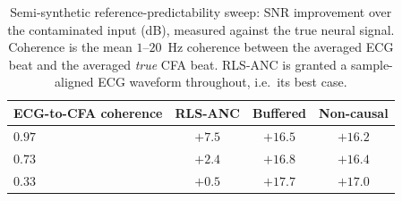 \begin{table}[!t]
\centering
\caption{Semi-synthetic reference-predictability sweep: SNR improvement over the
contaminated input (dB), measured against the true neural signal. Coherence is the mean
$1$--$20$~Hz coherence between the averaged ECG beat and the averaged \emph{true} CFA beat.
RLS-ANC is granted a sample-aligned ECG waveform throughout, i.e.\ its best case.}
\label{tab:sweep}
\begin{tabular}{@{}lccc@{}}
\toprule
ECG-to-CFA coherence & RLS-ANC & Buffered & Non-causal \\
\midrule
$0.97$ & $+7.5$ & $+16.5$ & $+16.2$ \\
$0.73$ & $+2.4$ & $+16.8$ & $+16.4$ \\
$0.33$ & $+0.5$ & $+17.7$ & $+17.0$ \\
\bottomrule
\end{tabular}
\end{table}
